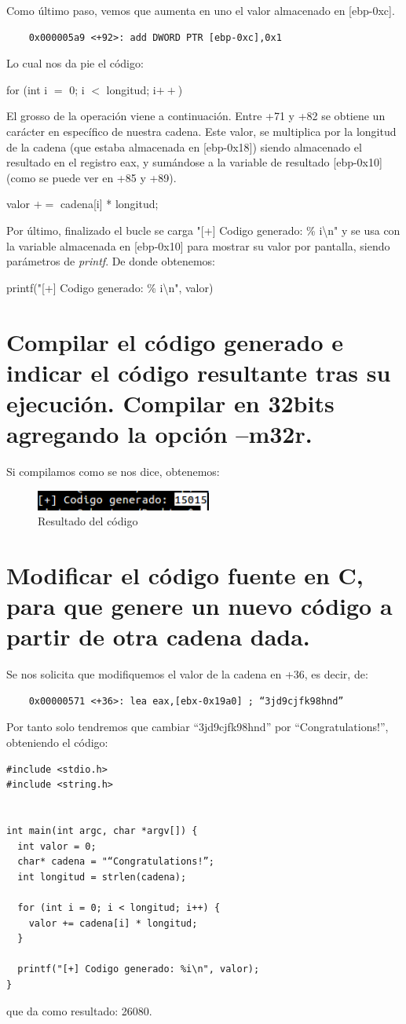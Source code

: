 \documentclass[12pt,twoside]{article}
\begin{document}
Como último paso, vemos que aumenta en uno el valor almacenado en [ebp-0xc]. 
\begin{verbatim}
    0x000005a9 <+92>: add DWORD PTR [ebp-0xc],0x1
\end{verbatim}
Lo cual nos da pie el código:
\begin{center}
for (int i $=$ 0; i $<$ longitud; i$++$)
\end{center}

El grosso de la operación viene a continuación. Entre +71 y +82 se obtiene un carácter en específico de nuestra cadena. Este valor, se multiplica por la longitud de la cadena (que estaba almacenada en [ebp-0x18]) siendo almacenado el resultado en el registro eax, y sumándose a la variable de resultado [ebp-0x10] (como se puede ver en +85 y +89). 
\begin{center}
   valor $+=$ cadena[i] * longitud;
\end{center}

Por último, finalizado el bucle se carga "[+] Codigo generado: \% i\textbackslash n" y  se usa con la variable almacenada en [ebp-0x10] para mostrar su valor por pantalla, siendo parámetros de \textit{printf}. De donde obtenemos:

\begin{center}
   printf("[+] Codigo generado: \% i\textbackslash n", valor)
\end{center}

\section{Compilar el código generado e indicar el código resultante tras su ejecución. Compilar en 32bits agregando la opción –m32r.}
Si compilamos como se nos dice, obtenemos:
\begin{figure}[h]
    \centering
    \includegraphics[scale=1]{./imagenes/captura}
    \caption{Resultado del código}
\end{figure}

\section{Modificar el código fuente en C, para que genere un nuevo código a partir de otra cadena dada.}
Se nos solicita que modifiquemos el valor de la cadena en +36, es decir, de:
\begin{verbatim}
    0x00000571 <+36>: lea eax,[ebx-0x19a0] ; “3jd9cjfk98hnd”
\end{verbatim}
Por tanto solo tendremos que cambiar “3jd9cjfk98hnd” por “Congratulations!”, obteniendo el código:
\begin{verbatim}
#include <stdio.h>
#include <string.h>


int main(int argc, char *argv[]) {
  int valor = 0;
  char* cadena = "“Congratulations!”;
  int longitud = strlen(cadena);

  for (int i = 0; i < longitud; i++) {
    valor += cadena[i] * longitud;
  }
  
  printf("[+] Codigo generado: %i\n", valor);
} 
\end{verbatim}
que da como resultado: 26080.
\end{document}
